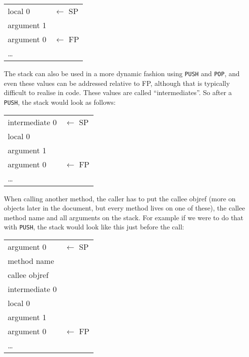\documentclass[12pt,a4paper]{article}
\begin{document}
\begin{table}[H]
\centering
\begin{tabular}{|p{3cm}|p{3cm}}
local 0 & $\leftarrow$ SP \\
argument 1 \\ 
argument 0 & $\leftarrow$ FP \\
\cline{1-1}
\ldots & \\
\end{tabular}
\end{table}

The stack can also be used in a more dynamic fashion using \verb|PUSH| and \verb|POP|, and even these values can be addressed relative to FP, although that is typically difficult to realise in code. These values are called ``intermediates''. So after a \verb|PUSH|, the stack would look as follows:

\begin{table}[H]
\centering
\begin{tabular}{|p{3cm}|p{3cm}}
intermediate 0 & $\leftarrow$ SP \\
local 0    \\    
argument 1 \\
argument 0 & $\leftarrow$ FP \\ 
\cline{1-1}
\ldots & \\
\end{tabular}
\end{table}

When calling another method, the caller has to put the callee objref (more on objects later in the document, but every method lives on one of these), the callee method name and all arguments on the stack. For example if we were to do that with \verb|PUSH|, the stack would look like this just before the call:

\begin{table}[H]
\centering
\begin{tabular}{|p{3cm}|p{3cm}}
argument 0 & $\leftarrow$ SP \\
method name \\
callee objref \\
intermediate 0 \\
local 0    \\    
argument 1 \\
argument 0 & $\leftarrow$ FP \\ 
\cline{1-1}
\ldots & \\
\end{tabular}
\end{table}
\end{document}
